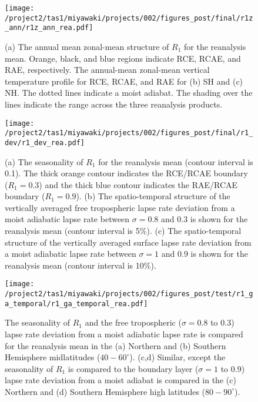 \documentclass{ametsocV5}
\begin{document}
\begin{figure}[t]
  \noindent\texttt{[image: /project2/tas1/miyawaki/projects/002/figures\_post/final/r1z\_ann/r1z\_ann\_rea.pdf]}\\
  \caption{(a) The annual mean zonal-mean structure of $R_{1}$ for the reanalysis mean. Orange, black, and blue regions indicate RCE, RCAE, and RAE, respectively. The annual-mean zonal-mean vertical temperature profile for RCE, RCAE, and RAE for (b) SH and (c) NH. The dotted lines indicate a moist adiabat. The shading over the lines indicate the range across the three reanalysis products.}
  \label{fig:rea-r1-ann}
\end{figure}

\begin{figure}[t]
  \noindent\texttt{[image: /project2/tas1/miyawaki/projects/002/figures\_post/final/r1\_dev/r1\_dev\_rea.pdf]}\\
  \caption{(a) The seasonality of $R_{1}$ for the reanalysis mean (contour interval is 0.1). The thick orange contour indicates the RCE/RCAE boundary ($R_1=0.3$) and the thick blue contour indicates the RAE/RCAE boundary ($R_1 = 0.9$). (b) The spatio-temporal structure of the vertically averaged free tropospheric lapse rate deviation from a moist adiabatic lapse rate between $\sigma=0.8$ and 0.3 is shown for the reanalysis mean (contour interval is 5\%). (c) The spatio-temporal structure of the vertically averaged surface lapse rate deviation from a moist adiabatic lapse rate between $\sigma=1$ and 0.9 is shown for the reanalysis mean (contour interval is 10\%).}
  \label{fig:rea-r1-dev}
\end{figure}

\begin{figure}[t]
  \noindent\texttt{[image: /project2/tas1/miyawaki/projects/002/figures\_post/test/r1\_ga\_temporal/r1\_ga\_temporal\_rea.pdf]}\\
  \caption{The seasonality of $R_1$ and the free tropospheric ($\sigma=0.8$ to 0.3) lapse rate deviation from a moist adiabatic lapse rate is compared for the reanalysis mean in the (a) Northern and (b) Southern Hemisphere midlatitudes ($40-60^\circ$). (c,d) Similar, except the seasonality of $R_1$ is compared to the boundary layer ($\sigma=1$ to 0.9) lapse rate deviation from a moist adiabat is compared in the (c) Northern and (d) Southern Hemisphere high latitudes ($80-90^\circ$).}
  \label{fig:rea-r1-ga-temporal}
\end{figure}
\end{document}
